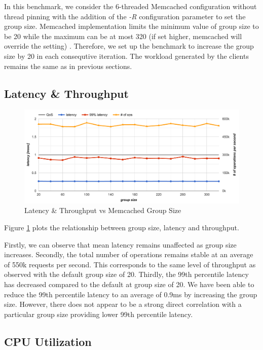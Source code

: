 In this benchmark, we consider the 6-threaded Memcached configuration without thread pinning with the addition of the \textit{-R} configuration parameter to set the group size. Memcached implementation limits the minimum value of group size to be 20 while the maximum can be at most 320 (if set higher, memcached will override the setting) \cite{blake54does}. Therefore, we set up the benchmark to increase the group size by 20 in each consequtive iteration. The workload generated by the clients remains the same as in previous sections.

\subsection{Latency \& Throughput}

\begin{figure}[h]
    \includegraphics[width=\textwidth]{./res2/m_group_size_latency.png}
    \caption{Latency \& Throughput vs Memcached Group Size }
    \label{fig:m_group_size_latency}
\end{figure}

Figure \ref{fig:m_group_size_latency} plots the relationship between group size, latency and throughput.

Firstly, we can observe that mean latency remains unaffected as group size increases.
Secondly, the total number of operations remains stable at an average of 550k requests per second. This corresponds to the same level of throughput as observed with the default group size of 20.
Thirdly, the 99th percentile latency has decreased compared to the default at group size of 20. We have been able to reduce the 99th percentile latency to an average of 0.9ms by increasing the group size. However, there does not appear to be a strong direct correlation with a particular group size providing lower 99th percentile latency.

\subsection{CPU Utilization}

